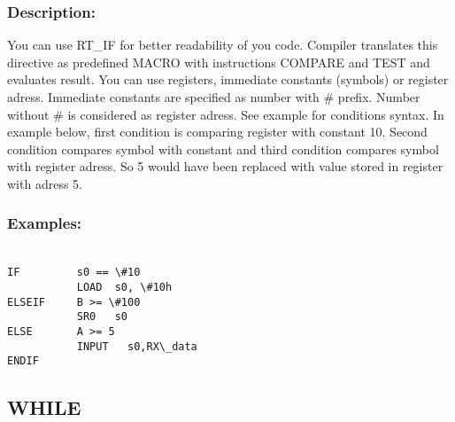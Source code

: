         \subsubsection{Description:}
        You can use RT\_IF for better readability of you code. Compiler translates this directive as predefined MACRO with instructions COMPARE and TEST and
        evaluates result. You can use registers, immediate constants (symbols) or register adress. Immediate constants are specified as number with \# prefix.
        Number without \# is considered as register adress. See example for conditions syntax. In example below, first condition is comparing register with constant 10. Second condition compares symbol with constant and third condition compares
        symbol with register adress. So 5 would have been replaced with value stored in register with adress 5.
        \subsubsection{Examples:}
        {
            ~\\
            \usecodefont
            \verb'IF         s0 == \#10'\\
            \verb'           LOAD  s0, \#10h'\\
            \verb'ELSEIF     B >= \#100'\\
            \verb'           SR0   s0'\\
            \verb'ELSE       A >= 5'\\
            \verb'           INPUT   s0,RX\_data'\\
            \verb'ENDIF'
        }
       
    \subsection{WHILE}
